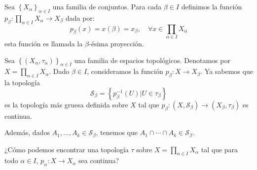 \documentclass[12pt]{report}
\theoremstyle{largebreak}
\newcommand\cf[3]{\ensuremath{#1:#2\rightarrow#3}}
\begin{document}
    \begin{mydef}
        Sea $\left\{X_\alpha \right\}_{\alpha\in I}$ una familia de conjuntos. Para cada $\beta\in I$ definimos la función $\cf{p_\beta}{\prod_{\alpha\in I}X_\alpha}{X_\beta}$ dada por:
        \begin{equation*}
            p_\beta(x)=x(\beta)=x_\beta,\quad\forall x\in\prod_{\alpha\in I}X_\alpha
        \end{equation*} 
        esta función es llamada la \textup{$\beta$-ésima proyección}.
    \end{mydef}

    Sea $\left\{(X_\alpha,\tau_\alpha) \right\}_{ \alpha\in I}$ una familia de espacios topológicos. Denotamos por $X=\prod_{\alpha\in I}X_\alpha$. Dado $\beta\in I$, consideramos la función $\cf{p_\beta}{X}{X_\beta}$. Ya sabemos que la topología
    \begin{equation*}
        \mathcal{S}_\beta=\left\{p_\beta^{-1}(U)\Big|U\in\tau_\beta \right\}
    \end{equation*}
    es la topología más gruesa definida sobre $X$ tal que $\cf{p_\beta}{(X,\mathcal{S}_\beta)}{(X_\beta,\tau_\beta)}$ es continua.

    Además, dados $A_1,...,A_k\in\mathcal{S}_\beta$, tenemos que $A_1\cap\cdots\cap A_k\in\mathcal{S}_\beta$.

    ¿Cómo podemos encontrar una topología $\tau$ sobre $X=\prod_{\alpha\in I}X_\alpha$ tal que para todo $\alpha\in I$, $\cf{p_\alpha}{X}{X_\alpha}$ sea continua?
\end{document}
